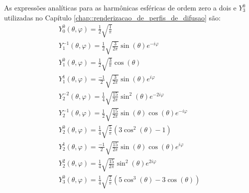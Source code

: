 \documentclass[
    12pt,                %
    oneside,            %
    a4paper,            %
    english,            %
    french,                %
    spanish,            %
    brazil                %
    ]{abntex2}
\begin{document}
 As expressões analíticas para as harmônicas esféricas de ordem zero a dois e $Y_3^0$ utilizadas no Capítulo \ref{chap::renderizacao_de_perfis_de_difusao} são:
\begin{equation}
\begin{array}{l}
Y_{0}^{0}(\theta, \varphi)=\frac{1}{2} \sqrt{\frac{1}{\pi}} \\
Y_{1}^{-1}(\theta, \varphi)=\frac{1}{2} \sqrt{\frac{3}{2 \pi}} \sin (\theta) e^{-i \varphi} \\
Y_{1}^{0}(\theta, \varphi)=\frac{1}{2} \sqrt{\frac{3}{\pi}} \cos (\theta) \\
Y_{1}^{1}(\theta, \varphi)=\frac{-1}{2} \sqrt{\frac{3}{2 \pi}} \sin (\theta) e^{i \varphi} \\
Y_{2}^{-2}(\theta, \varphi)=\frac{1}{4} \sqrt{\frac{15}{2 \pi}} \sin ^{2} (\theta) e^{-2 i \varphi} \\
Y_{2}^{-1}(\theta, \varphi)=\frac{1}{2} \sqrt{\frac{15}{2 \pi}} \sin (\theta) \cos (\theta) e^{-i \varphi} \\
Y_{2}^{0}(\theta, \varphi)=\frac{1}{4} \sqrt{\frac{5}{\pi}}\left(3 \cos ^{2} (\theta)-1\right) \\
Y_{2}^{1}(\theta, \varphi)=\frac{-1}{2} \sqrt{\frac{15}{2 \pi}} \sin (\theta) \cos (\theta) e^{i \varphi} \\
Y_{2}^{2}(\theta, \varphi)=\frac{1}{4} \sqrt{\frac{15}{2 \pi}} \sin ^{2} (\theta) e^{2 i \varphi} \\
Y_{3}^{0}(\theta, \varphi)=\frac{1}{4} \sqrt{\frac{7}{\pi}}\left(5 \cos ^{3} (\theta)-3 \cos (\theta)\right)
\end{array}
\end{equation}




\end{document}
